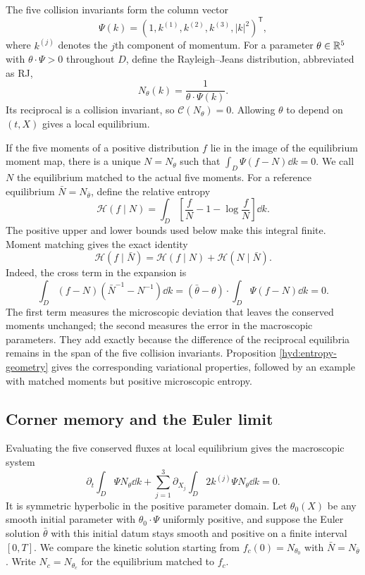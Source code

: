 The five collision invariants form the column vector
\[
 \Psi(k)=(1,k^{(1)},k^{(2)},k^{(3)},|k|^2)^{\mathsf T},
\]
where $k^{(j)}$ denotes the $j$th component of momentum. For a parameter
$\theta\in\mathbb R^5$ with $\theta\cdot\Psi>0$ throughout $D$, define the
Rayleigh--Jeans distribution, abbreviated as RJ,
\begin{equation}\label{intro:rj}
 N_\theta(k)=\frac1{\theta\cdot\Psi(k)}.
\end{equation}
Its reciprocal is a collision invariant, so $\mathcal C(N_\theta)=0$.
Allowing $\theta$ to depend on $(t,X)$ gives a local equilibrium.

If the five moments of a positive distribution $f$ lie in the image of
the equilibrium moment map, there is a unique $N=N_\theta$ such that
$\int_D\Psi(f-N)\dd k=0$. We call $N$ the equilibrium matched to the
actual five moments. For a reference equilibrium $\bar N=N_{\bar\theta}$,
define the relative entropy
\begin{equation}\label{intro:relative-entropy}
 \mathscr H(f\mid N)=\int_D
       \left[\frac fN-1-\log\frac fN\right]\dd k.
\end{equation}
The positive upper and lower bounds used below make this integral finite.
Moment matching gives the exact identity
\begin{equation}\label{intro:entropy-split}
 \boxed{\mathscr H(f\mid\bar N)
       =\mathscr H(f\mid N)+\mathscr H(N\mid\bar N).}
\end{equation}
Indeed, the cross term in the expansion is
\[
 \int_D(f-N)(\bar N^{-1}-N^{-1})\dd k
 =(\bar\theta-\theta)\cdot\int_D\Psi(f-N)\dd k=0.
\]
The first term measures the microscopic deviation that leaves the conserved
moments unchanged; the second measures the error in the macroscopic
parameters. They add exactly because the difference of the reciprocal
equilibria remains in the span of the five collision invariants.
Proposition \ref{hyd:entropy-geometry} gives the corresponding variational
properties, followed by an example with matched moments but positive
microscopic entropy.

\subsection{Corner memory and the Euler limit}

Evaluating the five conserved fluxes at local equilibrium gives the
macroscopic system
\begin{equation}\label{intro:euler}
 \partial_t\int_D\Psi N_\theta\dd k
 +\sum_{j=1}^3\partial_{X_j}\int_D2k^{(j)}\Psi N_\theta\dd k=0.
\end{equation}
It is symmetric hyperbolic in the positive parameter domain.
Let $\theta_0(X)$ be any smooth initial parameter with
$\theta_0\cdot\Psi$ uniformly positive, and suppose the Euler solution
$\bar\theta$ with this initial datum stays smooth and positive on a
finite interval $[0,T]$. We compare the kinetic solution starting from
$f_c(0)=N_{\theta_0}$ with $\bar N=N_{\bar\theta}$.
Write $N_c=N_{\theta_c}$ for the equilibrium matched to $f_c$.

